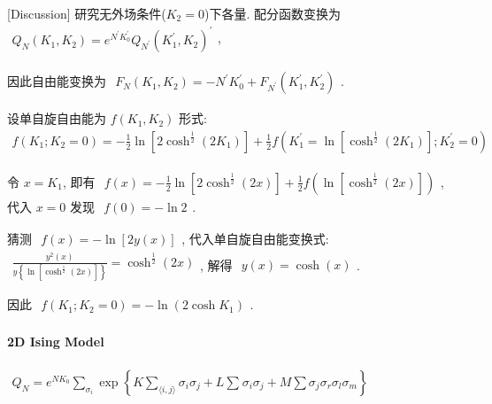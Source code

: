 \documentclass[../../main.tex]{subfiles}
\begin{document}
[Discussion] 研究无外场条件($K_{2}=0$)下各量. 配分函数变换为 $\begin{aligned}
    Q_{N}(K_{1},K_{2}) = e^{N^{\prime}K_{0}^{\prime}}Q_{N^{\prime}}(K_{1}^{\prime},K_{2})^{\prime}
\end{aligned}$, 

因此自由能变换为 $\begin{aligned}
    F_{N}(K_{1},K_{2}) = -N^{\prime}K_{0}^{\prime} + F_{N^{\prime}}(K_{1}^{\prime},K_{2}^{\prime})
\end{aligned}$. 

设单自旋自由能为 $f(K_{1},K_{2})$ 形式: $\begin{aligned}
    f(K_{1};K_{2}=0) = -\frac{1}{2}\ln{\left[
        2\cosh^{\frac{1}{2}}{(2K_{1})}
    \right]} + \frac{1}{2}f\left(
        K_{1}^{\prime} = \ln{\left[
            \cosh^{\frac{1}{2}}{(2K_{1})}
        \right]};K_{2}^{\prime}=0
    \right)
\end{aligned}$

令 $x = K_{1}$, 即有 $\begin{aligned} 
    f(x) = -\frac{1}{2}\ln{\left[
        2\cosh^{\frac{1}{2}}{(2x)}
    \right]} + \frac{1}{2}f\left(
        \ln{\left[
            \cosh^{\frac{1}{2}}{(2x)}
        \right]}
    \right)
\end{aligned}$, 代入 $x = 0$ 发现 $\begin{aligned}
    f(0) = -\ln{2}
\end{aligned}$. 

猜测 $\begin{aligned}
    f(x) = -\ln{[2y(x)]}
\end{aligned}$, 代入单自旋自由能变换式: $\begin{aligned}
    \frac{y^{2}(x)}{y\left\{\ln{\left[
        \cosh^{\frac{1}{2}}{(2x)}
    \right]}\right\}} = \cosh^{\frac{1}{2}}{(2x)}
\end{aligned}$, 解得 $\begin{aligned}
    y(x) = \cosh(x)
\end{aligned}$. 

因此 $\begin{aligned}
    \boxed{f(K_{1};K_{2}=0) = -\ln{(2\cosh{K_{1}})}}
\end{aligned}$. 

\paragraph{2D Ising Model}
$\begin{aligned}
    Q_{N} = e^{NK_{0}}\sum_{\sigma_{i}}\exp{\left\{
        K\sum_{\langle i,j\rangle}\sigma_{i}\sigma_{j} + L\sum_{}\sigma_{i}\sigma_{j} + M\sum\sigma_{j}\sigma_{r}\sigma_{l}\sigma_{m}
    \right\}}
\end{aligned}$
\end{document}
